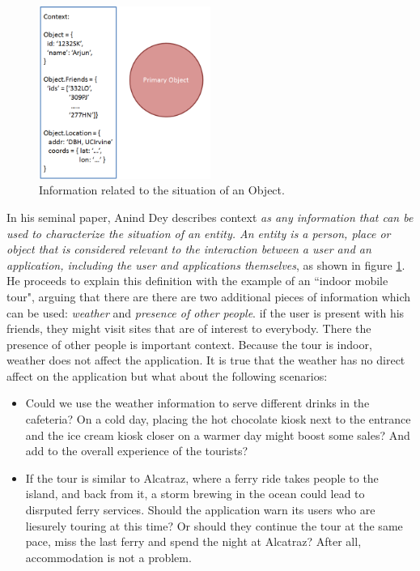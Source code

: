 \begin{figure}[t]
\centering
\includegraphics[width=0.5\textwidth]{media/chapter2/dey-def.png}
\caption{Information related to the situation of an Object.}
\label{fig:anind-def}
\end{figure}

In his seminal paper, Anind Dey \cite{dey2001understanding} describes context \textit{as any information that can be used to characterize the situation of an entity. An entity is a person, place or object that is considered relevant to the interaction between a user and an application, including the user and applications themselves}, as shown in figure \ref{fig:anind-def}. He proceeds to explain this definition with the example of an ``indoor mobile tour", arguing that there are there are two additional pieces of information which can be used: \textit{weather} and \textit{presence of other people}. if the user is present with his friends, they might visit sites that are of interest to everybody. There the presence of other people is important context. Because the tour is indoor, weather does not affect the application. It is true that the weather has no direct affect on the application but what about the following scenarios:

\begin{itemize}
\item Could we use the weather information to serve different drinks in the cafeteria? On a cold day, placing the hot chocolate kiosk next to the entrance and the ice cream kiosk closer on a warmer day might boost some sales? And add to the overall experience of the tourists?
\item If the tour is similar to Alcatraz, where a ferry ride takes people to the island, and back from it, a storm brewing in the ocean could lead to disrputed ferry services. Should the application warn its users who are liesurely touring at this time? Or should they continue the tour at the same pace, miss the last ferry and spend the night at Alcatraz? After all, accommodation is not a problem.
\end{itemize}


